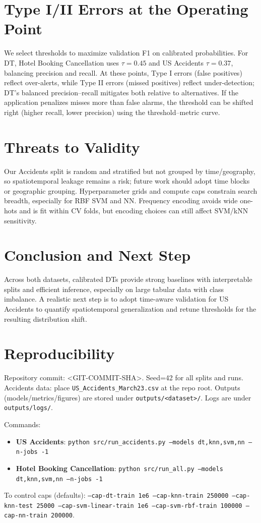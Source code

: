 \documentclass[conference]{IEEEtran}
\newcommand{\datasetA}{Hotel Booking Cancellation}
\newcommand{\datasetB}{US Accidents}
\newcommand{\commitsha}{<GIT-COMMIT-SHA>}
\newcommand{\seed}{42}
\begin{document}
\section{Type I/II Errors at the Operating Point}
We select thresholds to maximize validation F1 on calibrated probabilities. For DT, \datasetA{} uses $\tau\!=\!0.45$ and \datasetB{} $\tau\!=\!0.37$, balancing precision and recall. At these points, Type I errors (false positives) reflect over-alerts, while Type II errors (missed positives) reflect under-detection; DT's balanced precision–recall mitigates both relative to alternatives. If the application penalizes misses more than false alarms, the threshold can be shifted right (higher recall, lower precision) using the threshold–metric curve.

\section{Threats to Validity}
Our Accidents split is random and stratified but not grouped by time/geography, so spatiotemporal leakage remains a risk; future work should adopt time blocks or geographic grouping. Hyperparameter grids and compute caps constrain search breadth, especially for RBF SVM and NN. Frequency encoding avoids wide one-hots and is fit within CV folds, but encoding choices can still affect SVM/kNN sensitivity.

\section{Conclusion and Next Step}
Across both datasets, calibrated DTs provide strong baselines with interpretable splits and efficient inference, especially on large tabular data with class imbalance. A realistic next step is to adopt time-aware validation for \datasetB{} to quantify spatiotemporal generalization and retune thresholds for the resulting distribution shift.

\section*{Reproducibility}
Repository commit: \commitsha. Seed=\seed{} for all splits and runs. Accidents data: place \texttt{US\_Accidents\_March23.csv} at the repo root. Outputs (models/metrics/figures) are stored under \texttt{outputs/<dataset>/}. Logs are under \texttt{outputs/logs/}.

Commands:
\begin{itemize}
\item \textbf{\datasetB{}}: \texttt{python src/run\_accidents.py --models dt,knn,svm,nn --n-jobs -1}
\item \textbf{\datasetA{}}: \texttt{python src/run\_all.py --models dt,knn,svm,nn --n-jobs -1}
\end{itemize}
To control caps (defaults): \texttt{--cap-dt-train 1e6 --cap-knn-train 250000 --cap-knn-test 25000 --cap-svm-linear-train 1e6 --cap-svm-rbf-train 100000 --cap-nn-train 200000}.
\end{document}
